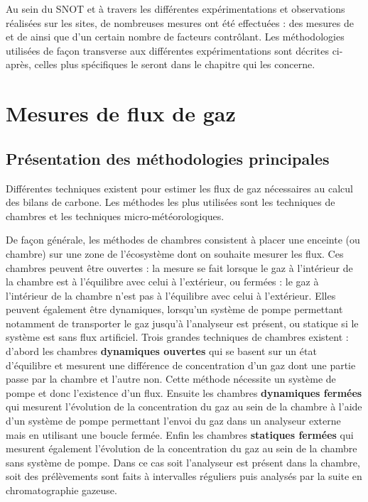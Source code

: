 Au sein du SNOT et à travers les différentes expérimentations et observations réalisées sur les sites, de nombreuses mesures ont été effectuées : des mesures de \coo et de \chh ainsi que d'un certain nombre de facteurs contrôlant.
Les méthodologies utilisées de façon transverse aux différentes expérimentations sont décrites ci-après, celles plus spécifiques le seront dans le chapitre qui les concerne.

\section{Mesures de flux de gaz}
\label{sec:clsd_chbr_method}

\subsection{Présentation des méthodologies principales}


Différentes techniques existent pour estimer les flux de gaz nécessaires au calcul des bilans de carbone.
Les méthodes les plus utilisées sont les techniques de chambres et les techniques micro-météorologiques.

De façon générale, les méthodes de chambres consistent à placer une enceinte (ou chambre) sur une zone de l'écosystème dont on souhaite mesurer les flux.
Ces chambres peuvent être ouvertes : la mesure se fait lorsque le gaz à l'intérieur de la chambre est à l'équilibre avec celui à l'extérieur, ou fermées : le gaz à l'intérieur de la chambre n'est pas à l'équilibre avec celui à l'extérieur.
Elles peuvent également être dynamiques, lorsqu'un système de pompe permettant notamment de transporter le gaz jusqu'à l'analyseur est présent, ou statique si le système est sans flux artificiel.
Trois grandes techniques de chambres existent : d'abord les chambres \textbf{dynamiques ouvertes} qui se basent sur un état d'équilibre et mesurent une différence de concentration d'un gaz dont une partie passe par la chambre et l'autre non. 
Cette méthode nécessite un système de pompe et donc l'existence d'un flux.
Ensuite les chambres \textbf{dynamiques fermées} qui mesurent l'évolution de la concentration du gaz au sein de la chambre à l'aide d'un système de pompe permettant l'envoi du gaz dans un analyseur externe mais en utilisant une boucle fermée.
Enfin les chambres \textbf{statiques fermées} qui mesurent également l'évolution de la concentration du gaz au sein de la chambre sans système de pompe.
Dans ce cas soit l'analyseur est présent dans la chambre, soit des prélèvements sont faits à intervalles réguliers puis analysés par la suite en chromatographie gazeuse.


